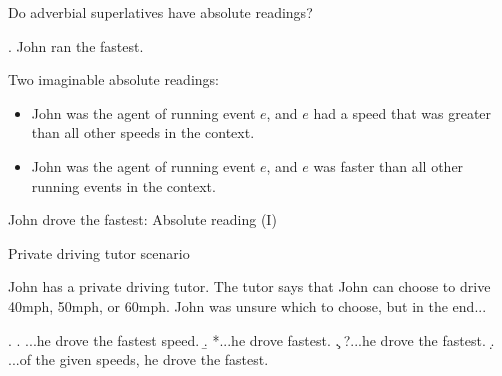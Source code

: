 \documentclass[xcolor=dvipsnames]{beamer}
\begin{document}
\begin{frame}{Do adverbial superlatives have absolute readings?}

\ex. John ran the fastest.

Two imaginable absolute readings:
\begin{itemize}
\item John was the agent of running event $e$, and $e$ had a speed
  that was greater than all other speeds in the context.
\item John was the agent of running event $e$, and $e$ was faster than
  all other running events in the context.
\end{itemize}
\end{frame}


\begin{frame}{John drove the fastest: Absolute reading (I)}

\begin{center}
\end{center}

\end{frame}


\begin{frame}{Private driving tutor scenario}

  John has a private driving tutor. The tutor says that John can
  choose to drive 40mph, 50mph, or 60mph. John was unsure which to
  choose, but in the end...

\ex.
\a. {...he drove the fastest speed.\label{tutor-the-fastest-speed}}
\b. {*...he drove fastest.\label{tutor-fastest}}
\c. {?...he drove the fastest.\label{tutor-the-fastest}}
\d. {...of the given speeds, he drove the
    fastest.\label{tutor-the-fastest-of}}

\end{frame}
\end{document}
